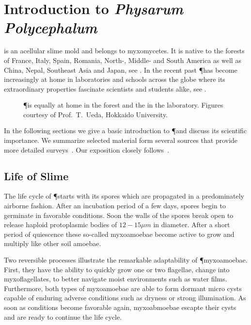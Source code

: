 \section{Introduction to \textit{Physarum Polycephalum}}

	\Pp is an acellular slime mold and belongs to myxomycetes. It is native to the forests of France, Italy, Spain, Romania, North-, Middle- and South America as well as China, Nepal, Southeast Asia and Japan, see . In the recent past \P has become increasingly at home in laboratories and schools across the globe where its extraordinary properties fascinate scientists and students alike, see .

	\begin{figure}
		\centering
		\caption[\P exploring various environments]{\P is equally at home in the forest and the in the laboratory. Figures courtesy of Prof.~T.~Ueda, Hokkaido University.}
		\label{fig:exploration}
	\end{figure}

	In the following sections we give a basic introduction to \P and discuss its scientific importance. We summarize selected material form several sources that provide more detailed surveys~\cite{stephenson1994myxomycetes,nowotny2000myxomyceten,grube2016physarum,Sauer1986,Mayne2016,howard1931life}. Our exposition closely follows~\cite{nowotny2000myxomyceten}.

	\subsection{Life of Slime}

		The life cycle of \P starts with its spores which are propagated in a predominately airborne fashion. After an incubation period of a few days, spores begin to germinate in favorable conditions. Soon the walls of the spores break open to release haploid protoplasmic bodies of $12-15 \mu m$ in diameter. After a short period of quiescence these so-called myxoamoebae become active to grow and multiply like other soil amoebae. 

		Two reversible processes illustrate the remarkable adaptability of \P myxoamoebae. First, they have the ability to quickly grow one or two flagellae, \ie change into myxoflagellates, to better navigate moist environments such as water films. Furthermore, both types of myxoamoebae are able to form dormant micro cysts capable of enduring adverse conditions such as dryness or strong illumination. As soon as conditions become favorable again, myxoabmoebae escapte their cysts and are ready to continue the life cycle.

